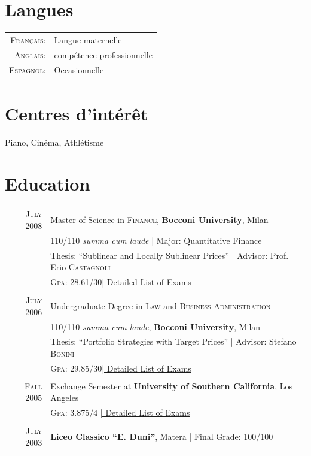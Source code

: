 \documentclass[a4paper,10pt]{article}
\begin{document}
\section{Langues}
\begin{tabular}{rl}
\textsc{Français:}&Langue maternelle\\
\textsc{Anglais:}&compétence professionnelle\\
\textsc{Espagnol:}&Occasionnelle\\
\end{tabular}

\section{Centres d'intérêt}
Piano, Cinéma, Athlétisme


\section{Education}
\begin{tabular}{rl}	
 \textsc{July} 2008 & Master of Science in \textsc{Finance}, \textbf{Bocconi University}, Milan\\
& 110/110 \small\emph{summa cum laude} | Major: Quantitative Finance\\
& Thesis: ``Sublinear and Locally Sublinear Prices'' | \small Advisor: Prof. Erio \textsc{Castagnoli}\\
&\normalsize \textsc{Gpa}: 28.61/30\hyperlink{grds}{\hfill | \footnotesize Detailed List of Exams}\\&\\
\textsc{July} 2006& Undergraduate Degree in \textsc{Law} and \textsc{Business Administration} \\&110/110 \small\emph{summa cum laude}, \normalsize\textbf{Bocconi University}, Milan\\
& Thesis: ``Portfolio Strategies with Target Prices'' | \small Advisor: Stefano \textsc{Bonini}\\
&\normalsize \textsc{Gpa}: 29.85/30\hyperlink{grds_cleli}{\hfill| \footnotesize Detailed List of Exams}\\&\\
\textsc{Fall} 2005& Exchange Semester at \textbf{University of Southern California}, Los Angeles\\
&\textsc{Gpa}: 3.875/4 \hyperlink{grds_usc}{\hfill| \footnotesize Detailed List of Exams}\\&\\
\textsc{July} 2003& \textbf{Liceo Classico ``E. Duni''}, Matera | Final Grade: 100/100
\end{tabular}
\end{document}
